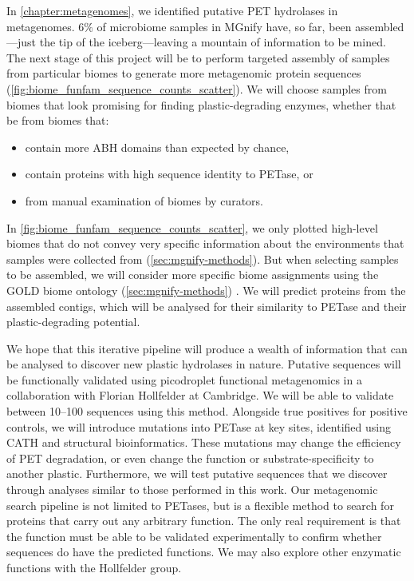 In \ref{chapter:metagenomes}, we identified putative PET hydrolases in metagenomes. $6\%$ of microbiome samples in MGnify have, so far, been assembled---just the tip of the iceberg---leaving a mountain of information to be mined. The next stage of this project will be to perform targeted assembly of samples from particular biomes to generate more metagenomic protein sequences (\ref{fig:biome_funfam_sequence_counts_scatter}). We will choose samples from biomes that look promising for finding plastic-degrading enzymes, whether that be from biomes that:
\begin{itemize}
    \item contain more ABH domains than expected by chance,
    \item contain proteins with high sequence identity to PETase, or
    \item from manual examination of biomes by curators.
\end{itemize}
In \ref{fig:biome_funfam_sequence_counts_scatter}, we only plotted high-level biomes that do not convey very specific information about the environments that samples were collected from (\ref{sec:mgnify-methods}). But when selecting samples to be assembled, we will consider more specific biome assignments using the GOLD biome ontology (\ref{sec:mgnify-methods}) \cite{Mukherjee2019}. We will predict proteins from the assembled contigs, which will be analysed for their similarity to PETase and their plastic-degrading potential.

We hope that this iterative pipeline will produce a wealth of information that can be analysed to discover new plastic hydrolases in nature. Putative sequences will be functionally validated using picodroplet functional metagenomics \cite{Colin2015} in a collaboration with Florian Hollfelder at Cambridge. We will be able to validate between \numrange{10}{100} sequences using this method. Alongside true positives for positive controls, we will introduce mutations into PETase at key sites, identified using CATH and structural bioinformatics. These mutations may change the efficiency of PET degradation, or even change the function or substrate-specificity to another plastic. Furthermore, we will test putative sequences that we discover through analyses similar to those performed in this work. Our metagenomic search pipeline is not limited to PETases, but is a flexible method to search for proteins that carry out any arbitrary function. The only real requirement is that the function must be able to be validated experimentally to confirm whether sequences do have the predicted functions. We may also explore other enzymatic functions with the Hollfelder group.